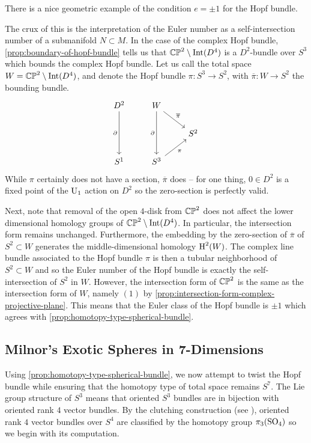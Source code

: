 \begin{remark*}
	There is a nice geometric example of the condition $e=\pm 1$ for the Hopf bundle.

	The crux of this is the interpretation of the Euler number as a self-intersection number of a submanifold $N\subset M$.
	In the case of the complex Hopf bundle, \cref{prop:boundary-of-hopf-bundle} tells us that $\mathbb{CP}^2\setminus \operatorname{Int}(D^4)$ is a $D^2$-bundle over $S^3$ which bounds the complex Hopf bundle. Let us call the total space $W=\mathbb{CP}^2\setminus \operatorname{Int}(D^4)$, and denote the Hopf bundle $\pi : S^3 \to S^2$, with $\overline{\pi} : W \to S^2$ the bounding bundle.
	\[
		\begin{tikzcd}
			D^2 & W & \\
			& & S^2\\
			S^1 & S^3 &
			\arrow["\partial"', from=1-1, to=3-1]
			\arrow["\partial"', from=1-2, to=3-2]
			\arrow["\pi"', from=3-2, to=2-3]
			\arrow["\overline{\pi}", from=1-2, to=2-3]
		\end{tikzcd}
	\]
	While $\pi$ certainly does not have a section, $\overline{\pi}$ does -- for one thing, $0\in D^2$ is a fixed point of the $\mathrm{U}_1$ action on $D^2$ so the zero-section is perfectly valid.

	Next, note that removal of the open $4$-disk from $\mathbb{CP}^2$ does not affect the lower dimensional homology groups of $\mathbb{CP}^2\setminus \operatorname{Int}(D^4)$. In particular, the intersection form remains unchanged.
	Furthermore, the embedding by the zero-section of $\overline{\pi}$ of $S^2\subset W$ generates the middle-dimensional homology $\operatorname{H}^2(W)$. The complex line bundle associated to the Hopf bundle $\pi$ is then a tubular neighborhood of $S^2\subset W$ and so the Euler number of the Hopf bundle is exactly the self-intersection of $S^2$ in $W$. However, the intersection form of $\mathbb{CP}^2$ is the same as the intersection form of $W$, namely $(1)$ by \cref{prop:intersection-form-complex-projective-plane}. This means that the Euler class of the Hopf bundle is $\pm 1$ which agrees with \cref{prop:homotopy-type-spherical-bundle}.
\end{remark*}

\subsection{Milnor's Exotic Spheres in 7-Dimensions}

Using \cref{prop:homotopy-type-spherical-bundle}, we now attempt to twist the Hopf bundle while ensuring that the homotopy type of total space remains $S^7$. The Lie group structure of $S^3$ means that oriented $S^3$ bundles are in bijection with oriented rank $4$ vector bundles. 
By the clutching construction (see \cite{hatcher2003ktheory}), oriented rank $4$ vector bundles over $S^4$ are classified by the homotopy group $\pi_3(\mathrm{SO}_4)$ so we begin with its computation.

